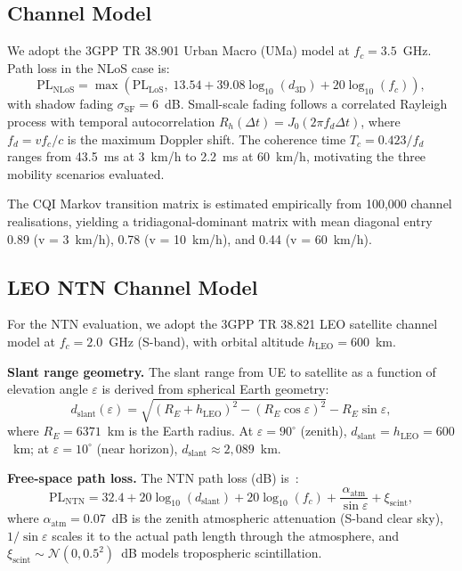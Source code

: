 \documentclass[conference]{IEEEtran}
\begin{document}
\subsection{Channel Model}

We adopt the 3GPP TR 38.901 Urban Macro (UMa) model at $f_c = 3.5$~GHz.
Path loss in the NLoS case is:
\begin{equation}
  \mathrm{PL}_{\mathrm{NLoS}} = \max\!\left(\mathrm{PL}_{\mathrm{LoS}},\;
    13.54 + 39.08\log_{10}(d_{\mathrm{3D}}) + 20\log_{10}(f_c)\right),
  \label{eq:pl}
\end{equation}
with shadow fading $\sigma_{\mathrm{SF}} = 6$~dB.
Small-scale fading follows a correlated Rayleigh process with temporal
autocorrelation $R_h(\Delta t) = J_0(2\pi f_d \Delta t)$, where
$f_d = v f_c / c$ is the maximum Doppler shift.
The coherence time $T_c = 0.423/f_d$ ranges from 43.5~ms at 3~km/h
to 2.2~ms at 60~km/h, motivating the three mobility scenarios evaluated.

The CQI Markov transition matrix is estimated empirically from 100,000
channel realisations, yielding a tridiagonal-dominant matrix with
mean diagonal entry 0.89 (v = 3~km/h), 0.78 (v = 10~km/h), and
0.44 (v = 60~km/h).

\subsection{LEO NTN Channel Model}
\label{subsec:ntn_channel}

For the NTN evaluation, we adopt the 3GPP TR 38.821 LEO satellite
channel model at $f_c = 2.0$~GHz (S-band), with orbital altitude
$h_{\mathrm{LEO}} = 600$~km.

\textbf{Slant range geometry.}
The slant range from UE to satellite as a function of elevation angle
$\varepsilon$ is derived from spherical Earth geometry:
\begin{equation}
  d_{\mathrm{slant}}(\varepsilon) =
    \sqrt{(R_E + h_{\mathrm{LEO}})^2 - (R_E \cos\varepsilon)^2}
    - R_E \sin\varepsilon,
  \label{eq:slant}
\end{equation}
where $R_E = 6371$~km is the Earth radius.
At $\varepsilon = 90^{\circ}$ (zenith), $d_{\mathrm{slant}} = h_{\mathrm{LEO}} = 600$~km;
at $\varepsilon = 10^{\circ}$ (near horizon), $d_{\mathrm{slant}} \approx 2{,}089$~km.

\textbf{Free-space path loss.}
The NTN path loss (dB) is~\cite{3gpp_tr38821}:
\begin{equation}
  \mathrm{PL}_{\mathrm{NTN}} = 32.4 + 20\log_{10}(d_{\mathrm{slant}})
    + 20\log_{10}(f_c)
    + \frac{\alpha_{\mathrm{atm}}}{\sin\varepsilon}
    + \xi_{\mathrm{scint}},
  \label{eq:ntn_pl}
\end{equation}
where $\alpha_{\mathrm{atm}} = 0.07$~dB is the zenith atmospheric
attenuation (S-band clear sky), $1/\sin\varepsilon$ scales it to the
actual path length through the atmosphere, and
$\xi_{\mathrm{scint}} \sim \mathcal{N}(0, 0.5^2)$~dB models
tropospheric scintillation.
\end{document}
